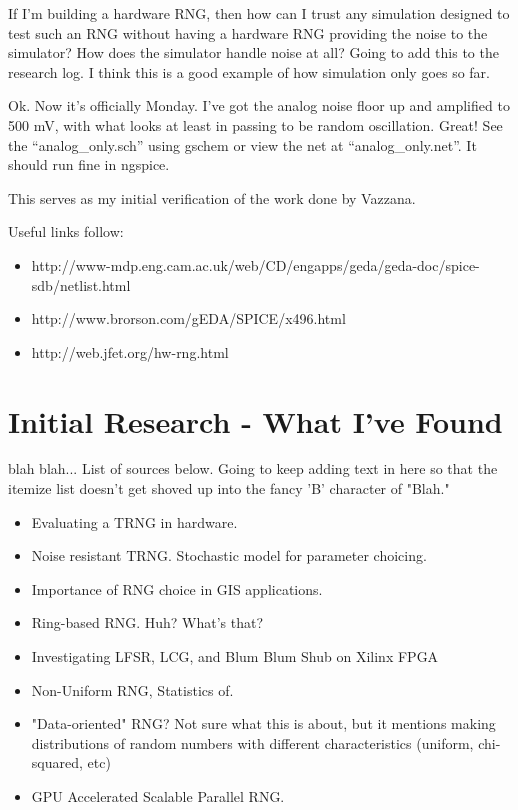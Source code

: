 \documentclass[journal]{IEEEtran}
\begin{document}
If I'm building a hardware RNG, then how can I trust any simulation designed
to test such an RNG without having a hardware RNG providing the noise to
the simulator? How does the simulator handle noise at all? Going to add
this to the research log. I think this is a good example of how simulation
only goes so far.

Ok. Now it's officially Monday. I've got the analog noise floor up and 
amplified to 500 mV, with what looks at least in passing to be random 
oscillation. Great! See the ``analog\_only.sch'' using gschem or view the 
net at ``analog\_only.net''. It should run fine in ngspice. 

This serves as my initial verification of the work done by Vazzana.

Useful links follow:

\begin{itemize}
\item
http://www-mdp.eng.cam.ac.uk/web/CD/engapps/geda/geda-doc/spice-sdb/netlist.html
\item
http://www.brorson.com/gEDA/SPICE/x496.html
\item
http://web.jfet.org/hw-rng.html
\end{itemize}

\section{Initial Research - What I've Found}

 blah blah... List of sources below. Going to keep 
adding text in here so that the itemize list doesn't get shoved up into 
the fancy 'B' character of "Blah."

\begin{itemize}
\item
\cite{000321520700011n.d.} Evaluating a TRNG in hardware.
\item
\cite{000322026900007n.d.} Noise resistant TRNG. Stochastic model for parameter choicing.
\item
\cite{6082794820110401} Importance of RNG choice in GIS applications.
\item
\cite{6102549620110515} Ring-based RNG. Huh? What's that?
\item
\cite{8288132620110601} Investigating LFSR, LCG, and Blum Blum Shub on 
Xilinx FPGA
\item
\cite{8704557320120101} Non-Uniform RNG, Statistics of.
\item
\cite{8762674520130201} "Data-oriented" RNG? Not sure what this is about, but it mentions 
making distributions of random numbers with different characteristics (uniform, chi-squared, 
etc)
\item
\cite{000315974100018n.d.} GPU Accelerated Scalable Parallel RNG.
\end{itemize}

{}

\end{document}

